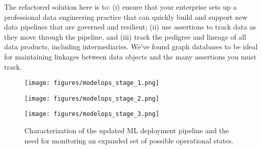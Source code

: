 The refactored solution here is to: (i) ensure that your enterprise sets up a professional data engineering practice that can quickly build and support new data pipelines that are governed and resilient; (ii) use
assertions to track
data as they move through
the pipeline, and
(iii) track the pedigree and lineage of all
data products, 
including intermediaries.
We've found graph databases to be ideal for maintaining linkages between data objects and the many assertions you must track.
\begin{figure*}[!ht]
    \begin{minipage}{0.45\textwidth}
    \centering
    \texttt{[image: figures/modelops\_stage\_1.png]}
    \label{fig:ml_deployment_1}
    \end{minipage}
    \hfill
    \begin{minipage}{0.45\textwidth}
    \centering
    \texttt{[image: figures/modelops\_stage\_2.png]}
    \label{fig:ml_deployment_2}
    \end{minipage}
    \vfill
    \begin{minipage}{0.6\textwidth}
    \centering
    \texttt{[image: figures/modelops\_stage\_3.png]}
    \label{fig:ml_deployment_3}
    \end{minipage}
    \caption{Characterization of the updated ML deployment pipeline and the need for monitoring an expanded set of possible operational states.}
\end{figure*}